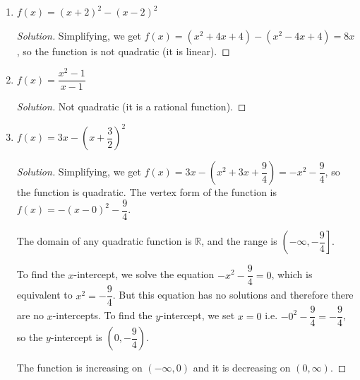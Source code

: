 \documentclass[12pt]{article}
\newenvironment{solution}{\begin{proof}[Solution]}{\end{proof}}
\begin{document}
\begin{enumerate}
\begin{enumerate}
\begin{solution}
			\end{solution}
			\item $f(x)=(x+2)^2-(x-2)^2$
			
			\begin{solution}
				Simplifying, we get $f(x)=(x^2+4x+4)-(x^2-4x+4)=8x$, so the function is not quadratic (it is linear).
			\end{solution}
			\item $f(x)=\dfrac{x^2-1}{x-1}$
			
			\begin{solution}
				Not quadratic (it is a rational function).
			\end{solution}
			\item $f(x)=3x-(x+\dfrac{3}{2})^2$
			
			\begin{solution}
				Simplifying, we get $f(x)=3x-(x^2+3x+\dfrac{9}{4})=-x^2-\dfrac{9}{4}$, so the function is quadratic. The vertex form of the function is $f(x)=-(x-0)^2-\dfrac{9}{4}$.
				
				The domain of any quadratic function is $\mathbb{R}$, and the range is $\left( -\infty, -\dfrac{9}{4}\right]$.
				
				To find the $x$-intercept, we solve the equation $-x^2-\dfrac{9}{4}=0$, which is equivalent to $x^2=-\dfrac{9}{4}$. But this equation has no solutions and therefore there are no $x$-intercepts. To find the $y$-intercept, we set $x=0$ i.e. $-0^2-\dfrac{9}{4}=-\dfrac{9}{4}$, so the $y$-intercept is $(0,-\dfrac{9}{4})$.
				
				The function is increasing on $(-\infty,0)$ and it is decreasing on $(0,\infty)$.
				

\end{solution}
\end{enumerate}
\end{enumerate}
\end{document}
